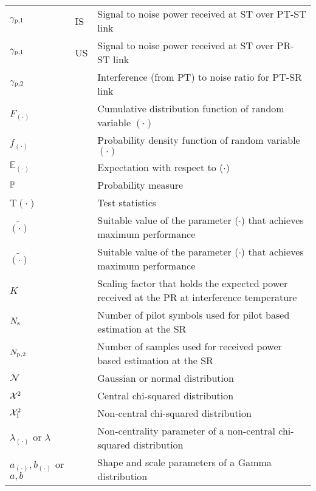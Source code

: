 \begin{longtable}{p{}p{}p{}}
	${\gamma}_{\text{p,1}}$  		& IS &		Signal to noise power received at ST over PT-ST link \\ 
	${\gamma}_{\text{p,1}}$  		& US &		Signal to noise power received at ST over PR-ST link \\ 
        ${\gamma}_{\text{p,2}}$                & &             Interference (from PT) to noise ratio for PT-SR link \\
       $F_{(\cdot)}$            & &          Cumulative distribution function of random variable $(\cdot)$ \\
       $f_{(\cdot)}$            & &          Probability density function of random variable $(\cdot)$ \\
       $\mathbb E_{(\cdot)}$    & &		Expectation with respect to ($\cdot$) \\
       $\mathbb P$                     & &     	Probability measure \\
       T$(\cdot)$  	        & &          Test statistics \\
       $\tilde{(\cdot)}$        & &		Suitable value of the parameter ($\cdot$) that achieves maximum performance \\
       $\tilde{(\cdot)}$        & &		Suitable value of the parameter ($\cdot$) that achieves maximum performance \\
       $K$                      & &      Scaling factor that holds the expected power received at the PR at interference temperature  \\
       $N_{\text{s}}$                    & &      Number of pilot symbols used for pilot based estimation at the SR \\
       $N_{\text{p,2}}$                    & &      Number of samples used for received power based estimation at the SR \\
       $\mathcal N$                & &      Gaussian or normal distribution\\
       $\cchi2 $                & &      Central chi-squared distribution \\
       $\ncchi2$                & &      Non-central chi-squared distribution \\
       $\lambda_{(\cdot)}$ or $\lambda$  &     &       Non-centrality parameter of a non-central chi-squared distribution \\
       $a_{(\cdot)}, b_{(\cdot)}$ or $a, b$ &  &       Shape and scale parameters of a Gamma distribution \\


\end{longtable}
